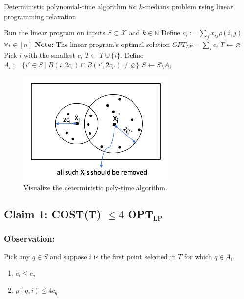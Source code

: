 \begin{algorithm}[H]
\caption{Deterministic polynomial-time algorithm for $k$-medians problem using linear programming relaxation}\label{kmedian}
\begin{algorithmic}
\STATE Run the linear program on inputs $S\subset \mathcal{X}$ and $k\in\mathbb{N}$
\STATE Define $c_i:=\sum_j x_{ij}\rho(i, j)$ $\forall i\in[n]$
\STATE \textbf{Note:} The linear program's optimal solution $OPT_{LP}=\sum_i c_i$
\STATE $T\leftarrow \varnothing$
\STATE Pick $i$ with the smallest $c_i$
\STATE $T\leftarrow T\cup\{i\}$.
\STATE Define $A_i:=\{i'\in S\;|\; B(i,2c_i)\cap B(i', 2c_{i'})\neq\varnothing\}$
\STATE $S\leftarrow S\setminus A_i$
\ENDWHILE
\end{algorithmic}
\end{algorithm}

\begin{figure}[h]
\centering
\includegraphics[width=0.7\textwidth]{chapter_1/files/kmedians_polytime_algo}
\caption{Visualize the deterministic poly-time algorithm. }
\end{figure}
\subsection*{Claim 1: COST(T) $\leq 4$ OPT$_{\text{LP}}$}
\subsubsection*{Observation:}
Pick any $q \in S$ and suppose $i$ is the first point selected in $T$  for which $q \in A_i$.

\begin{enumerate}
	\item $c_i \leq c_q$
	\item $\rho(q, i) \leq 4 c_q$
\end{enumerate}

